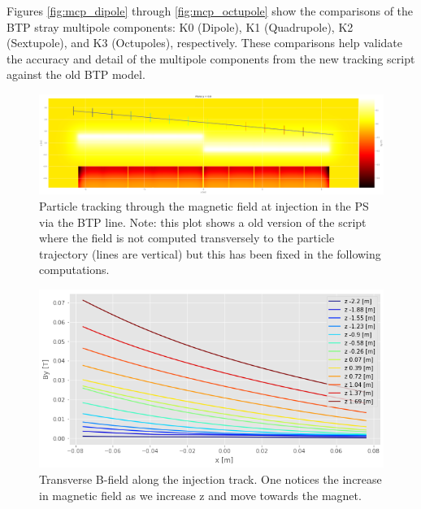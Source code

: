 Figures \ref{fig:mcp_dipole} through \ref{fig:mcp_octupole} show the comparisons of the BTP stray multipole components: K0 (Dipole), K1 (Quadrupole), K2 (Sextupole), and K3 (Octupoles), respectively. These comparisons help validate the accuracy and detail of the multipole components from the new tracking script against the old BTP model.

\begin{figure}[H]
\centering
\includegraphics[width=1.0\textwidth]{02_Simulation/images/MCP_track.png}
\caption{Particle tracking through the magnetic field at injection in the PS via the BTP line. Note: this plot shows a old version of the script where the field is not computed transversely to the particle trajectory (lines are vertical) but this has been fixed in the following computations.}
\label{fig:mcp_track}
\end{figure}

\begin{figure}[H]
\centering
\includegraphics[width=1.0\textwidth]{02_Simulation/images/MCP_track_2.png}
\caption{Transverse B-field along the injection track. One notices the increase in magnetic field as we increase z and move towards the magnet.}
\label{fig:mcp_track_2}
\end{figure}

